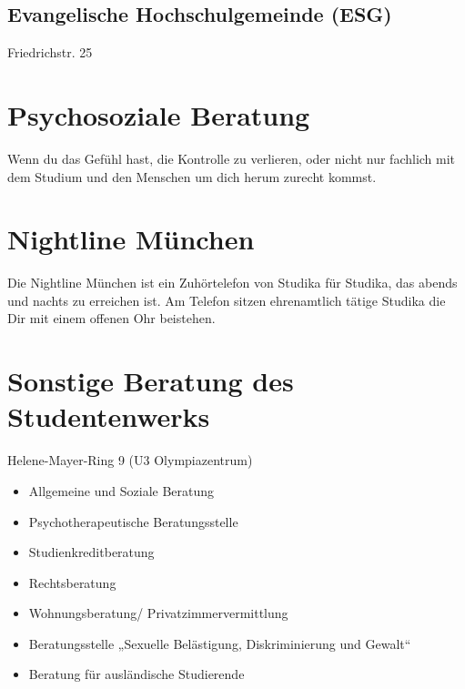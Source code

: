 \subsection*{Evangelische Hochschulgemeinde (ESG)}
Friedrichstr. 25

\begin{urlList}
\end{urlList}

\section{Psychosoziale Beratung}

Wenn du das Gefühl hast, die Kontrolle zu verlieren, oder nicht nur fachlich mit
dem Studium und den Menschen um dich herum zurecht kommst.

\begin{urlList}
\end{urlList}

\section{Nightline München}

Die Nightline München ist ein Zuhörtelefon von Studika für Studika,
das abends und nachts zu erreichen ist. Am Telefon sitzen ehrenamtlich
tätige Studika die Dir mit einem offenen Ohr beistehen.

\begin{urlList}
\end{urlList}


\section{Sonstige Beratung des Studentenwerks}
Helene-Mayer-Ring 9 (U3 Olympiazentrum)

\begin{itemize}
	\item Allgemeine und Soziale Beratung
	\item Psychotherapeutische Beratungsstelle
	\item Studienkreditberatung
	\item Rechtsberatung
	\item Wohnungsberatung/ Privatzimmervermittlung
	\item Beratungsstelle „Sexuelle Belästigung, Diskriminierung und Gewalt“
	\item Beratung für ausländische Studierende
\end{itemize}

\begin{urlList}
\end{urlList}

